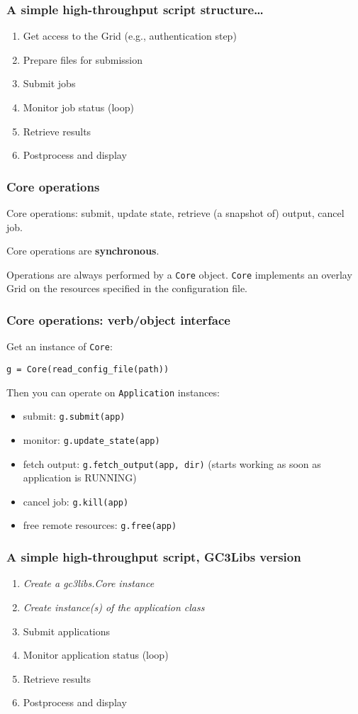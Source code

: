 \documentclass[presentation]{beamer}
\begin{document}
\begin{frame}
\frametitle{A simple high-throughput script structure\ldots{}}
\label{sec-12}

\begin{enumerate}
\item Get access to the Grid (e.g., authentication step)
\item Prepare files for submission
\item Submit jobs
\item Monitor job status (loop)
\item Retrieve results
\item Postprocess and display
\end{enumerate}
\end{frame}
\begin{frame}
\frametitle{Core operations}
\label{sec-13}

  Core operations: submit, update state, retrieve (a
  snapshot of) output, cancel job.

  Core operations are \textbf{synchronous}.
  
  Operations are always performed by a \texttt{Core} object.
  \texttt{Core} implements an overlay Grid on the resources 
  specified in the configuration file.
\end{frame}
\begin{frame}[fragile]
\frametitle{Core operations: verb/object interface}
\label{sec-14}

  Get an instance of \texttt{Core}:
\begin{verbatim}
g = Core(read_config_file(path))
\end{verbatim}

  Then you can operate on \texttt{Application} instances:
\begin{itemize}
\item submit: \texttt{g.submit(app)}
\item monitor: \texttt{g.update\_state(app)}
\item fetch output: \texttt{g.fetch\_output(app, dir)} (starts working as soon as
    application is RUNNING)
\item cancel job: \texttt{g.kill(app)}
\item free remote resources: \texttt{g.free(app)}
\end{itemize}
\end{frame}
\begin{frame}
\frametitle{A simple high-throughput script, GC3Libs version}
\label{sec-15}

\begin{enumerate}
\item \emph{Create a gc3libs.Core instance}
\item \emph{Create instance(s) of the application class}
\item Submit applications
\item Monitor application status (loop)
\item Retrieve results
\item Postprocess and display
\end{enumerate}
\end{frame}
\end{document}
